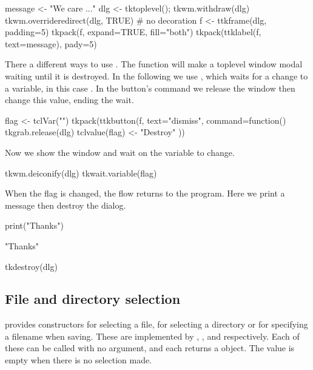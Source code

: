 \begin{Schunk}
\begin{Sinput}
 message <- "We care ..."
 dlg <- tktoplevel(); tkwm.withdraw(dlg)
 tkwm.overrideredirect(dlg, TRUE)   # no decoration
 f <- ttkframe(dlg, padding=5)
 tkpack(f, expand=TRUE, fill="both")
 tkpack(ttklabel(f, text=message), pady=5)
\end{Sinput}
\end{Schunk}

There a different ways to use . The function
 will make a toplevel window modal waiting
until it is destroyed. In the following we use
, which waits for a change to a variable, in
this case .  In the button's command we release the window
then change this value, ending the wait.
\begin{Schunk}
\begin{Sinput}
 flag <- tclVar("")
 tkpack(ttkbutton(f, text="dismiss", command=function() {
   tkgrab.release(dlg)
   tclvalue(flag) <- "Destroy"
 }))
\end{Sinput}
\end{Schunk}
Now we show the window and wait on the  variable to change.
\begin{Schunk}
\begin{Sinput}
 tkwm.deiconify(dlg)
 tkwait.variable(flag)
\end{Sinput}
\end{Schunk}

When the flag is changed, the flow returns to the program. Here we
print a message then destroy the dialog.
\begin{Schunk}
\begin{Sinput}
 print("Thanks")
\end{Sinput}
\begin{Soutput}
[1] "Thanks"
\end{Soutput}
\begin{Sinput}
 tkdestroy(dlg)
\end{Sinput}
\end{Schunk}


\subsection{File and directory selection}
\label{sec:file-direct-select}

\Tk\/ provides constructors for selecting a file, for selecting a
directory or for specifying a filename when saving. These are
implemented by ,
, and 
respectively. Each of these can be called with no argument, and
each returns a  object. The value is empty when there is no selection made.

